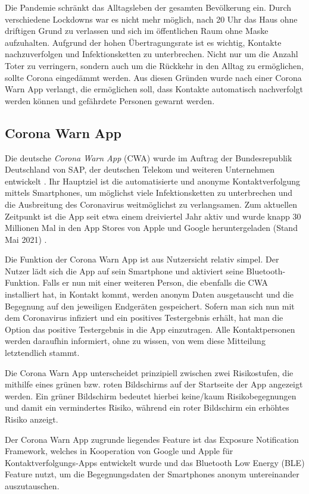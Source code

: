 \documentclass[conference,compsoc]{IEEEtran}
\begin{document}
Die Pandemie schränkt das Alltagsleben der gesamten Bevölkerung ein. 
Durch verschiedene Lockdowns war es nicht mehr möglich, nach 20 Uhr das Haus ohne driftigen Grund zu verlassen und sich im öffentlichen Raum ohne Maske aufzuhalten. 
Aufgrund der hohen Übertragungsrate ist es wichtig, Kontakte nachzuverfolgen und Infektionsketten zu unterbrechen.
Nicht nur um die Anzahl Toter zu verringern, sondern auch um die Rückkehr in den Alltag zu ermöglichen, sollte Corona eingedämmt werden.
Aus diesen Gründen wurde nach einer Corona Warn App verlangt, die ermöglichen soll, dass Kontakte automatisch nachverfolgt werden können und gefährdete Personen gewarnt werden.

\subsection{Corona Warn App}
Die deutsche \textit{Corona Warn App} (CWA) wurde im Auftrag der Bundesrepublik Deutschland von SAP, der deutschen Telekom und weiteren Unternehmen entwickelt \cite{CWA}. 
Ihr Hauptziel ist die automatisierte und anonyme Kontaktverfolgung mittels Smartphones, um möglichst viele Infektionsketten zu unterbrechen und die Ausbreitung des Coronavirus weitmöglichst zu verlangsamen. 
Zum aktuellen Zeitpunkt ist die App seit etwa einem dreiviertel Jahr aktiv und wurde knapp 30 Millionen Mal in den App Stores von Apple und Google heruntergeladen (Stand Mai 2021) \cite{Downloads}.

Die Funktion der Corona Warn App ist aus Nutzersicht relativ simpel. Der Nutzer lädt sich die App auf sein Smartphone und aktiviert seine Bluetooth-Funktion. 
Falls er nun mit einer weiteren Person, die ebenfalls die CWA installiert hat, in Kontakt kommt, werden anonym Daten ausgetauscht und die Begegnung auf den jeweiligen Endgeräten gespeichert. 
Sofern man sich nun mit dem Coronavirus infiziert und ein positives Testergebnis erhält, hat man die Option das positive Testergebnis in die App einzutragen. 
Alle Kontaktpersonen werden daraufhin informiert, ohne zu wissen, von wem diese Mitteilung letztendlich stammt. 

Die Corona Warn App unterscheidet prinzipiell zwischen zwei Risikostufen, die mithilfe eines grünen bzw. roten Bildschirms auf der Startseite der App angezeigt werden. 
Ein grüner Bildschirm bedeutet hierbei keine/kaum Risikobegegnungen und damit ein vermindertes Risiko, während ein roter Bildschirm ein erhöhtes Risiko anzeigt.

Der Corona Warn App zugrunde liegendes Feature ist das \glqq Exposure Notification Framework\grqq, 
welches in Kooperation von Google und Apple für Kontaktverfolgungs-Apps entwickelt wurde und das Bluetooth Low Energy (BLE) Feature nutzt, 
um die Begegnungsdaten der Smartphones anonym untereinander auszutauschen. \\
\end{document}

